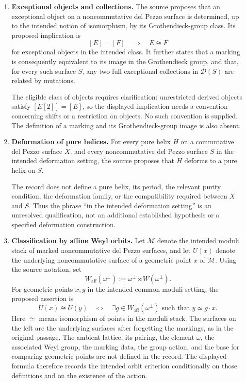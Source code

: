 \documentclass[11pt]{article}
\begin{document}
\begin{enumerate}
\item \textbf{Exceptional objects and collections.} The source proposes that an exceptional object on a noncommutative del Pezzo surface is determined, up to the intended notion of isomorphism, by its Grothendieck-group class. Its proposed implication is
\[
[E]=[F]\quad\Longrightarrow\quad E\cong F
\]
for exceptional objects in the intended class. It further states that a marking is consequently equivalent to its image in the Grothendieck group, and that, for every such surface \(S\), any two full exceptional collections in \(\mathcal D(S)\) are related by mutations.

The eligible class of objects requires clarification: unrestricted derived objects satisfy \([E[2]]=[E]\), so the displayed implication needs a convention concerning shifts or a restriction on objects. No such convention is supplied. The definition of a marking and its Grothendieck-group image is also absent.

\item \textbf{Deformation of pure helices.} For every pure helix \(H\) on a commutative del Pezzo surface \(X\), and every noncommutative del Pezzo surface \(S\) in the intended deformation setting, the source proposes that \(H\) deforms to a pure helix on \(S\).

The record does not define a pure helix, its period, the relevant purity condition, the deformation family, or the compatibility required between \(X\) and \(S\). Thus the phrase ``in the intended deformation setting'' is an unresolved qualification, not an additional established hypothesis or a specified deformation construction.

\item \textbf{Classification by affine Weyl orbits.} Let \(\mathcal M\) denote the intended moduli stack of marked noncommutative del Pezzo surfaces, and let \(U(x)\) denote the underlying noncommutative surface of a geometric point \(x\) of \(\mathcal M\). Using the source notation, set
\[
W_{\mathrm{aff}}(\omega^\perp)
:=\omega^\perp\rtimes W(\omega^\perp).
\]
For geometric points \(x,y\) in the intended common moduli setting, the proposed assertion is
\[
U(x)\cong U(y)
\quad\Longleftrightarrow\quad
\exists g\in W_{\mathrm{aff}}(\omega^\perp)\text{ such that }y\simeq g\cdot x.
\]
Here \(\simeq\) means isomorphism of points in the moduli stack. The surfaces on the left are the underlying surfaces after forgetting the markings, as in the original passage. The ambient lattice, its pairing, the element \(\omega\), the associated Weyl group, the marking data, the group action, and the base for comparing geometric points are not defined in the record. The displayed formula therefore records the intended orbit criterion conditionally on those definitions and on the existence of the action.
\end{enumerate}
\end{document}
